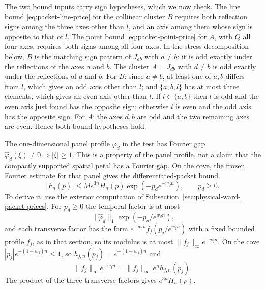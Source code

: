 The two bound inputs carry sign hypotheses, which we now check.  The line
bound \eqref{eq:packet-line-price} for the collinear cluster $B$ requires
both reflection signs among the three axes other than $l$, and an axis
among them whose sign is opposite to that of $l$.  The point bound
\eqref{eq:packet-point-price} for $A$, with $Q$ all four axes, requires
both signs among all four axes.  In the stress decomposition below, $B$ is
the matching sign pattern of $J_{ab}$ with $a\ne b$: it is odd exactly
under the reflections of the axes $a$ and $b$.  The cluster $A=J_{db}$
with $d\ne b$ is odd exactly under the reflections of $d$ and $b$.  For
$B$: since $a\ne b$, at least one of $a,b$ differs from $l$, which gives
an odd axis other than $l$; and $\{a,b,l\}$ has at most three elements,
which gives an even axis other than $l$.  If $l\in\{a,b\}$ then $l$ is odd
and the even axis just found has the opposite sign; otherwise $l$ is even
and the odd axis has the opposite sign.  For $A$: the axes $d,b$ are odd
and the two remaining axes are even.  Hence both bound hypotheses hold.

The one-dimensional panel profile $\varphi_d$ in the test has Fourier gap
$\widehat\varphi_d(\xi)\ne0\Rightarrow |\xi|\geq1$.  This is a property
of the panel profile, not a claim that the compactly supported spatial
petal has a Fourier gap.  On the cove, the frozen Fourier estimate for that panel gives
the differentiated-packet bound
\begin{equation}
 |F_n(p)|\leq M e^{3n}H_n(p)
                    \exp(-p_de^{-w_dn}),\qquad p_d\geq0.
\label{eq:ward-packet-tail}
\end{equation}
To derive it, use the exterior computation of
Subsection~\ref{sec:physical-ward-packet-prices}.  For $p_d\ge0$ the temporal
factor is at most
\[
 \|\widehat\varphi_d\|_1\exp(-p_d/e^{w_dn}),
\]
and each
transverse factor has the form $e^{-w_jn}f_j(p_j/e^{w_jn})$ with a fixed
bounded profile $f_j$, as in that section, so its modulus is at most
$\|f_j\|_\infty e^{-w_jn}$.  On the cove $|p_j|e^{-(1+w_j)n}\le1$, so
$h_{j,n}(p_j)=e^{-(1+w_j)n}$ and
\[
 \|f_j\|_\infty e^{-w_jn}=\|f_j\|_\infty\,e^{n}h_{j,n}(p_j).
\]
The product of the three transverse factors gives $e^{3n}H_n(p)$.

